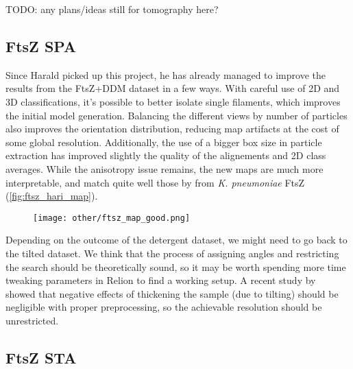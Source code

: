 TODO: any plans/ideas still for tomography here?

\subsection{FtsZ SPA}

Since Harald picked up this project, he has already managed to improve the results from the FtsZ+DDM dataset in a few ways.
With careful use of 2D and 3D classifications, it's possible to better isolate single filaments, which improves the initial model generation.
Balancing the different views by number of particles also improves the orientation distribution, reducing map artifacts at the cost of some global resolution.
Additionally, the use of a bigger box size in particle extraction has improved slightly the quality of the alignements and 2D class averages.
While the anisotropy issue remains, the new maps are much more interpretable, and match quite well those by \citet{fujitaStructuresFtsZSingle2023} from \textit{K. pneumoniae} FtsZ (\autoref{fig:ftsz_hari_map}).

\begin{figure}[ht]
    \centering
    \texttt{[image: other/ftsz\_map\_good.png]}
    \label{fig:ftsz_hari_map}
\end{figure}

Depending on the outcome of the detergent dataset, we might need to go back to the tilted dataset.
We think that the process of assigning angles and restricting the search should be theoretically sound, so it may be worth spending more time tweaking parameters in Relion to find a working setup.
A recent study by ~\citet{aiyerOvercomingResolutionAttenuation2024} showed that negative effects of thickening the sample (due to tilting) should be negligible with proper preprocessing, so the achievable resolution should be unrestricted.

\subsection{FtsZ STA}


